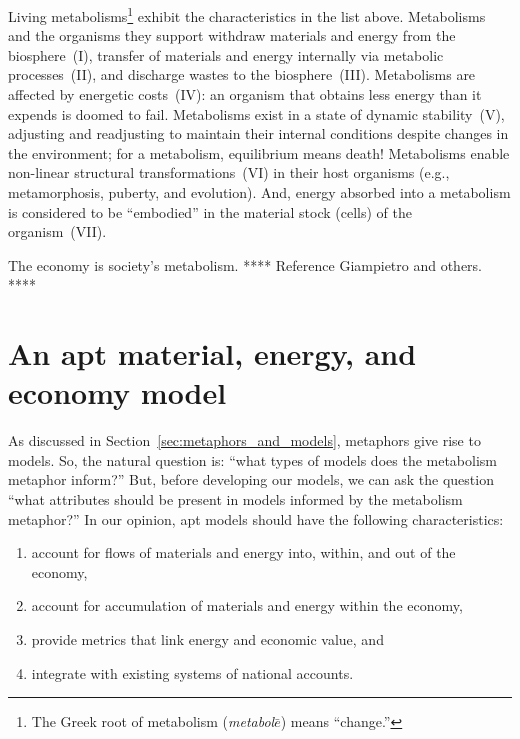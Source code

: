 Living metabolisms\footnote{The 
	Greek root of metabolism 
	(\emph{metabol$\bar{e}$}) means ``change.''}
exhibit the characteristics in the list above.
Metabolisms and the organisms they support
withdraw materials and energy from the biosphere~(I), 
transfer of materials and energy internally via metabolic processes~(II), 
and discharge wastes to the biosphere~(III).
Metabolisms are affected by energetic costs~(IV): 
an organism that obtains less energy than it expends 
is doomed to fail.
Metabolisms exist in a state of dynamic stability~(V),
adjusting and readjusting to maintain their internal conditions
despite changes in the environment; 
for a metabolism, equilibrium means death!
Metabolisms enable non-linear structural transformations~(VI)
in their host organisms (e.g., metamorphosis, puberty, and evolution).
And, energy absorbed into a metabolism is considered to be ``embodied''
in the material stock (cells) of the organism~(VII).

The economy is society's metabolism. 
**** Reference Giampietro and others. ****
~\cite{F-K1998, Giampietro2000, Giampietro2013}


\section{An apt material, energy, and economy model}
\label{sec:apt_models}

As discussed in Section~\ref{sec:metaphors_and_models}, 
metaphors give rise to models.
So, the natural question is: 
``what types of models does the metabolism metaphor inform?''
But, before developing our models, we can ask the question
``what attributes should be present in models informed
by the metabolism metaphor?'' 
In our opinion, apt models should have the following characteristics:

\begin{enumerate}
	\item{account for flows of materials and energy into, within, and out of the economy,}
	\item{account for accumulation of materials and energy within the economy,}
	\item{provide metrics that link energy and economic value, and}
	\item{integrate with existing systems of national accounts.}
\end{enumerate}

